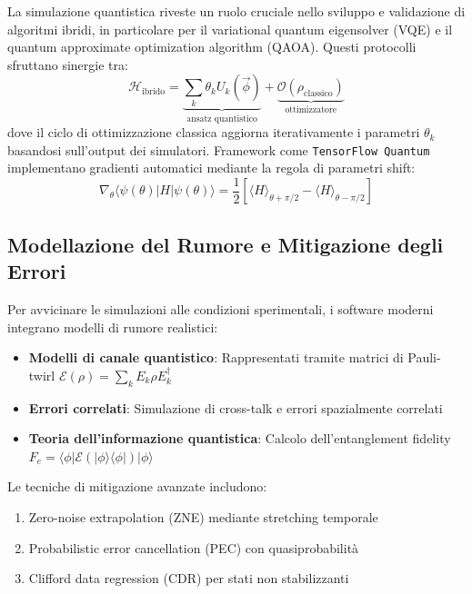 \documentclass[a4paper,12pt]{report}
\theoremstyle{plain}
\begin{document}
La simulazione quantistica riveste un ruolo cruciale nello sviluppo e validazione di algoritmi ibridi, in particolare per il variational quantum eigensolver (VQE) e il quantum approximate optimization algorithm (QAOA). Questi protocolli sfruttano sinergie tra:
\begin{equation}
\mathcal{H}_{\text{ibrido}} = \underbrace{\sum_k \theta_k U_k(\vec{\phi})}_{\text{ansatz quantistico}} + \underbrace{\mathcal{O}(\rho_{\text{classico}})}_{\text{ottimizzatore}}
\end{equation}
dove il ciclo di ottimizzazione classica aggiorna iterativamente i parametri $\theta_k$ basandosi sull'output dei simulatori. Framework come \texttt{TensorFlow Quantum} implementano gradienti automatici mediante la regola di parametri shift:
\begin{equation}
\nabla_\theta \langle \psi(\theta) | H | \psi(\theta) \rangle = \frac{1}{2} \left[ \langle H \rangle_{\theta + \pi/2} - \langle H \rangle_{\theta - \pi/2} \right]
\end{equation}

\subsection{Modellazione del Rumore e Mitigazione degli Errori}
\label{subsec:rumore}

Per avvicinare le simulazioni alle condizioni sperimentali, i software moderni integrano modelli di rumore realistici:
\begin{itemize}
    \item \textbf{Modelli di canale quantistico}: Rappresentati tramite matrici di Pauli-twirl $\mathcal{E}(\rho) = \sum_k E_k \rho E_k^\dagger$
    \item \textbf{Errori correlati}: Simulazione di cross-talk e errori spazialmente correlati
    \item \textbf{Teoria dell'informazione quantistica}: Calcolo dell'entanglement fidelity $F_e = \langle \phi | \mathcal{E}(|\phi\rangle\langle\phi|) | \phi \rangle$
\end{itemize}
Le tecniche di mitigazione avanzate includono:
\begin{enumerate}
    \item Zero-noise extrapolation (ZNE) mediante stretching temporale
    \item Probabilistic error cancellation (PEC) con quasiprobabilità
    \item Clifford data regression (CDR) per stati non stabilizzanti
\end{enumerate}
\end{document}
